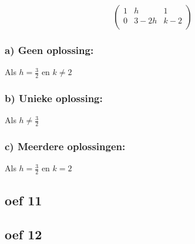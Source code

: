 \documentclass[10pt,a4paper]{article}
\begin{document}
\[
\begin{pmatrix}
1 & h & 1\\
0 & 3-2h & k-2\\
\end{pmatrix}
\]
\subsubsection*{a) Geen oplossing:}
Als $h = \frac{3}{2}$ en $k \neq 2$
\subsubsection*{b) Unieke oplossing:}
Als $h \neq \frac{3}{2}$
\subsubsection*{c) Meerdere oplossingen:}
Als $h = \frac{3}{2}$ en $k = 2$
\subsection*{oef 11}

\subsection*{oef 12}
\end{document}
